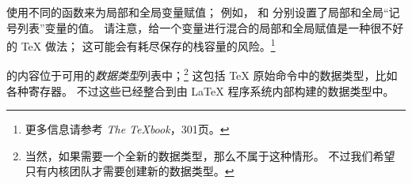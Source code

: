 \documentclass{l3doc}
\begin{document}

使用不同的函数来为局部和全局变量赋值；
例如， 和  分别设置了局部和全局“记号列表”变量的值。
请注意，给一个变量进行混合的局部和全局赋值是一种很不好的 \TeX{} 做法；
这可能会有耗尽保存的栈容量的风险。\footnote{
更多信息请参考 \emph{The \TeX{}book}，301页。}

%
%
 的内容位于可用的\emph{数据类型}列表中；\footnote{
当然，如果需要一个全新的数据类型，那么不属于这种情形。
不过我们希望只有内核团队才需要创建新的数据类型。}
这包括 \TeX{} 原始命令中的数据类型，比如各种寄存器。
不过这些已经整合到由 \LaTeX{} 程序系统内部构建的数据类型中。
\end{document}
